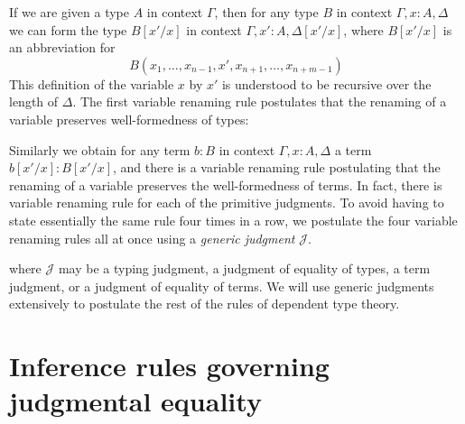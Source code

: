 If we are given a type $A$ in context $\Gamma$, then for any type $B$ in context $\Gamma,x:A,\Delta$ we can form the type $B[x'/x]$ in context $\Gamma,x':A,\Delta[x'/x]$, where $B[x'/x]$ is an abbreviation for
\begin{equation*}
B(x_1,\ldots,x_{n-1},x',x_{n+1},\ldots,x_{n+m-1})
\end{equation*}
This definition of  the variable $x$ by $x'$ is understood to be recursive over the length of $\Delta$. The first variable renaming rule postulates that the renaming of a variable preserves well-formedness of types:
\begin{prooftree}
\end{prooftree}

Similarly we obtain for any term $b:B$ in context $\Gamma,x:A,\Delta$ a term $b[x'/x]:B[x'/x]$, and there is a variable renaming rule postulating that the renaming of a variable preserves the well-formedness of terms.
In fact, there is variable renaming rule for each of the primitive judgments. To avoid having to state essentially the same rule four times in a row, we postulate the four variable renaming rules all at once using a \emph{generic judgment} $\mathcal{J}$. 
\begin{prooftree}
\end{prooftree}
where $\mathcal{J}$ may be a typing judgment, a judgment of equality of types, a term judgment, or a judgment of equality of terms.
We will use generic judgments extensively to postulate the rest of the rules of dependent type theory.

\section{Inference rules governing judgmental equality}

